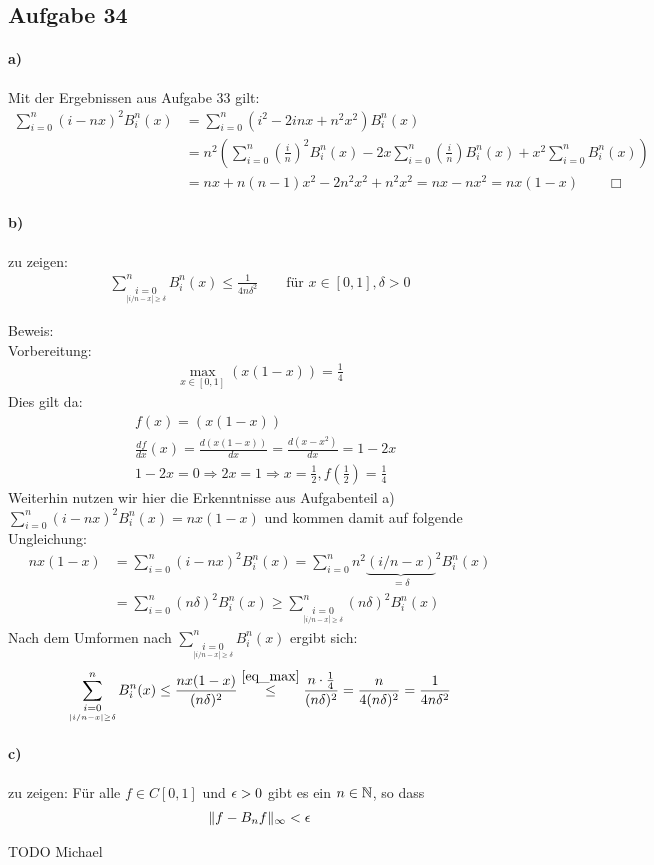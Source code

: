 \subsection*{Aufgabe 34}

\paragraph*{a)}
Mit der Ergebnissen aus Aufgabe 33 gilt:
\begin{align*}
  \sum_{i = 0}^n (i - n x)^2 B_i^n(x) &= \sum_{i = 0}^n (i^2 - 2 i n x + n^2x^2) B_i^n(x) \\
  & = n^2 \left(\sum_{i = 0}^n \left(\frac{i}{n}\right)^2   B_i^n(x) -
    2 x \sum_{i = 0}^n \left(\frac{i}{n}\right) B_i^n(x) + x^2 \sum_{i = 0}^n B_i^n(x) \right) \\
  & =  n x + n(n-1) x^2 - 2 n^2 x^2 + n^2 x^2 = n x - n x^2 = n x (1 - x) \qquad \Box
\end{align*}

\paragraph*{b)}
zu zeigen:\begin{align*}
\sum_{\underset{|i/n-x|\ge \delta}{i=0}}^n B_i^n(x) \le \frac{1}{4n\delta^2} \qquad \text{für } x \in[0,1], \delta >0
\end{align*}

Beweis:\\\newline
Vorbereitung:
\begin{align}\label{eq_max}
\max_{x\in[0,1]}(x(1-x))=\frac{1}{4}
\end{align}
Dies gilt da: \begin{align*}
&f(x)=(x(1-x))\\
&\frac{df}{dx}(x)=\frac{d(x(1-x))}{dx}=\frac{d(x-x^2)}{dx}=1-2x\\
&1-2x=0 \Rightarrow 2x=1 \Rightarrow x=\frac{1}{2}, f\left(\frac{1}{2}\right)=\frac{1}{4}
\end{align*}
Weiterhin nutzen wir hier die Erkenntnisse aus Aufgabenteil a)
$ \sum_{i = 0}^n (i - n x)^2 B_i^n(x)  = nx (1-x)$ und kommen damit auf folgende Ungleichung:
\begin{align}
nx (1-x) &=\sum_{i = 0}^n (i - n x)^2 B_i^n(x) %
=\sum_{i = 0}^n n^2 {\underbrace{(i/n - x )}_{= \delta}}^2 B_i^n(x) \\
&= \sum_{i=0}^n (n\delta)^2 B_i^n(x)
\ge \sum_{\underset{|i/n-x|\ge \delta}{i=0}}^n (n\delta)^2 B_i^n(x)
\end{align}
Nach dem Umformen nach $\sum_{\underset{|i/n-x|\ge \delta}{i=0}}^n B_i^n(x)$ ergibt sich:
\begin{align}
\sum_{\underset{|i/n-x|\ge \delta}{i=0}}^n B_i^n(x) \le
\frac{nx(1-x)}{(n\delta)^2}\overset{\eqref{eq_max}}{\le}
\frac{n\cdot\frac{1}{4}}{(n\delta)^2}=\frac{n}{4(n\delta)^2}=\frac{1}{4n\delta^2}
\end{align}
\paragraph*{c)}
zu zeigen: Für alle $f \in C[0,1]$ und $\epsilon >0$ gibt es ein $n\in \mathbb N$, so dass\begin{align*}
\|f-B_nf\|_\infty < \epsilon
\end{align*}

TODO Michael
